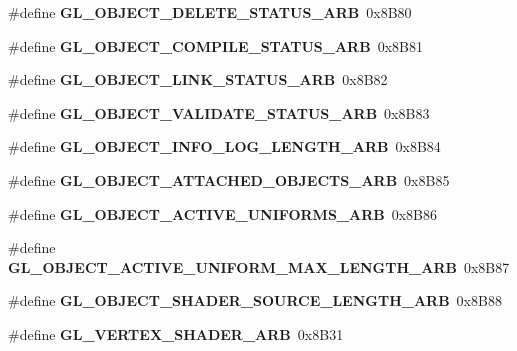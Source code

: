 \begin{DoxyCompactItemize}
\item 
\#define {\bfseries G\+L\+\_\+\+O\+B\+J\+E\+C\+T\+\_\+\+D\+E\+L\+E\+T\+E\+\_\+\+S\+T\+A\+T\+U\+S\+\_\+\+A\+R\+B}~0x8\+B80\label{_s_d_l__opengl_8h_af1fdb7f5aae5d8d729a1cecadefc1d36}

\item 
\#define {\bfseries G\+L\+\_\+\+O\+B\+J\+E\+C\+T\+\_\+\+C\+O\+M\+P\+I\+L\+E\+\_\+\+S\+T\+A\+T\+U\+S\+\_\+\+A\+R\+B}~0x8\+B81\label{_s_d_l__opengl_8h_a631e9e70a5429e15a85299dd91977360}

\item 
\#define {\bfseries G\+L\+\_\+\+O\+B\+J\+E\+C\+T\+\_\+\+L\+I\+N\+K\+\_\+\+S\+T\+A\+T\+U\+S\+\_\+\+A\+R\+B}~0x8\+B82\label{_s_d_l__opengl_8h_a7d08a14c95fd192b889cac7455bb3415}

\item 
\#define {\bfseries G\+L\+\_\+\+O\+B\+J\+E\+C\+T\+\_\+\+V\+A\+L\+I\+D\+A\+T\+E\+\_\+\+S\+T\+A\+T\+U\+S\+\_\+\+A\+R\+B}~0x8\+B83\label{_s_d_l__opengl_8h_a6fb6c19e9f5ed84b8b964250071e1bdd}

\item 
\#define {\bfseries G\+L\+\_\+\+O\+B\+J\+E\+C\+T\+\_\+\+I\+N\+F\+O\+\_\+\+L\+O\+G\+\_\+\+L\+E\+N\+G\+T\+H\+\_\+\+A\+R\+B}~0x8\+B84\label{_s_d_l__opengl_8h_a15891ff4b57899953121ddc1b4526861}

\item 
\#define {\bfseries G\+L\+\_\+\+O\+B\+J\+E\+C\+T\+\_\+\+A\+T\+T\+A\+C\+H\+E\+D\+\_\+\+O\+B\+J\+E\+C\+T\+S\+\_\+\+A\+R\+B}~0x8\+B85\label{_s_d_l__opengl_8h_a819dcf0331519d9319bb20d356e6a5e1}

\item 
\#define {\bfseries G\+L\+\_\+\+O\+B\+J\+E\+C\+T\+\_\+\+A\+C\+T\+I\+V\+E\+\_\+\+U\+N\+I\+F\+O\+R\+M\+S\+\_\+\+A\+R\+B}~0x8\+B86\label{_s_d_l__opengl_8h_ae477a6628ae48bd715fcb4705cfd167c}

\item 
\#define {\bfseries G\+L\+\_\+\+O\+B\+J\+E\+C\+T\+\_\+\+A\+C\+T\+I\+V\+E\+\_\+\+U\+N\+I\+F\+O\+R\+M\+\_\+\+M\+A\+X\+\_\+\+L\+E\+N\+G\+T\+H\+\_\+\+A\+R\+B}~0x8\+B87\label{_s_d_l__opengl_8h_aff17daa38f5bbcb24ba5baa75ad34218}

\item 
\#define {\bfseries G\+L\+\_\+\+O\+B\+J\+E\+C\+T\+\_\+\+S\+H\+A\+D\+E\+R\+\_\+\+S\+O\+U\+R\+C\+E\+\_\+\+L\+E\+N\+G\+T\+H\+\_\+\+A\+R\+B}~0x8\+B88\label{_s_d_l__opengl_8h_a80a858ed3f18341de6ebaa6240a8624c}

\item 
\#define {\bfseries G\+L\+\_\+\+V\+E\+R\+T\+E\+X\+\_\+\+S\+H\+A\+D\+E\+R\+\_\+\+A\+R\+B}~0x8\+B31\label{_s_d_l__opengl_8h_a8db63d8394d2fb15d70fdac444e7c868}


\end{DoxyCompactItemize}
